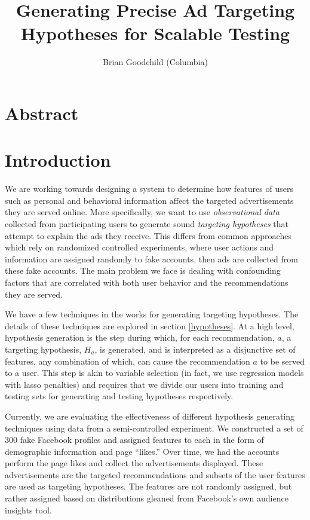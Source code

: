 \documentclass[]{article}
\title{Generating Precise Ad Targeting Hypotheses for Scalable Testing}
\author{
            Brian Goodchild (Columbia)
        }
\date{}
\begin{document}
\maketitle

\hypertarget{abstract}{%
\section*{Abstract}\label{abstract}}

\hypertarget{introduction}{%
\section{Introduction}\label{introduction}}

\indent We are working towards designing a system to determine how
features of users such as personal and behavioral information affect the
targeted advertisements they are served online. More specifically, we
want to use \textit{observational data} collected from participating
users to generate sound \textit{targeting hypotheses} that attempt to
explain the ads they receive. This differs from common approaches which
rely on randomized controlled experiments, where user actions and
information are assigned randomly to fake accounts, then ads are
collected from these fake accounts. The main problem we face is dealing
with confounding factors that are correlated with both user behavior and
the recommendations they are served.

We have a few techniques in the works for generating targeting
hypotheses. The details of these techniques are explored in section
\ref{hypotheses}. At a high level, hypothesis generation is the step
during which, for each recommendation, \(a\), a targeting hypothesis,
\(H_a\), is generated, and is interpreted as a disjunctive set of
features, any combination of which, can cause the recommendation \(a\)
to be served to a user. This step is akin to variable selection (in
fact, we use regression models with lasso penalties) and requires that
we divide our users into training and testing sets for generating and
testing hypotheses respectively.

Currently, we are evaluating the effectiveness of different hypothesis
generating techniques using data from a semi-controlled experiment. We
constructed a set of 300 fake Facebook profiles and assigned features to
each in the form of demographic information and page ``likes.'' Over
time, we had the accounts perform the page likes and collect the
advertisements displayed. These advertisements are the targeted
recommendations and subsets of the user features are used as targeting
hypotheses. The features are not randomly assigned, but rather assigned
based on distributions gleaned from Facebook's own audience insights
tool.
\end{document}
